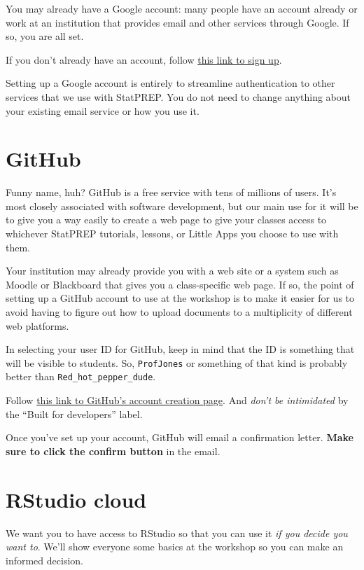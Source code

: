 \documentclass[]{book}
\theoremstyle{definition}
\theoremstyle{definition}
\theoremstyle{definition}
\theoremstyle{remark}
\begin{document}
You may already have a Google account: many people have an account
already or work at an institution that provides email and other services
through Google. If so, you are all set.

If you don't already have an account, follow
\href{https://support.google.com/mail/answer/56256?hl=en}{this link to
sign up}.

Setting up a Google account is entirely to streamline authentication to
other services that we use with StatPREP. You do not need to change
anything about your existing email service or how you use it.

\section{GitHub}\label{github}

Funny name, huh? GitHub is a free service with tens of millions of
users. It's most closely associated with software development, but our
main use for it will be to give you a way easily to create a web page to
give your classes access to whichever StatPREP tutorials, lessons, or
Little Apps you choose to use with them.

Your institution may already provide you with a web site or a system
such as Moodle or Blackboard that gives you a class-specific web page.
If so, the point of setting up a GitHub account to use at the workshop
is to make it easier for us to avoid having to figure out how to upload
documents to a multiplicity of different web platforms.

In selecting your user ID for GitHub, keep in mind that the ID is
something that will be visible to students. So, \texttt{ProfJones} or
something of that kind is probably better than
\texttt{Red\_hot\_pepper\_dude}.

Follow \href{https://github.com/}{this link to GitHub's account creation
page}. And \emph{don't be intimidated} by the ``Built for developers''
label.

Once you've set up your account, GitHub will email a confirmation
letter. \textbf{Make sure to click the confirm button} in the email.

\section{RStudio cloud}\label{rstudio-cloud}

We want you to have access to RStudio so that you can use it \emph{if
you decide you want to}. We'll show everyone some basics at the workshop
so you can make an informed decision.
\end{document}
